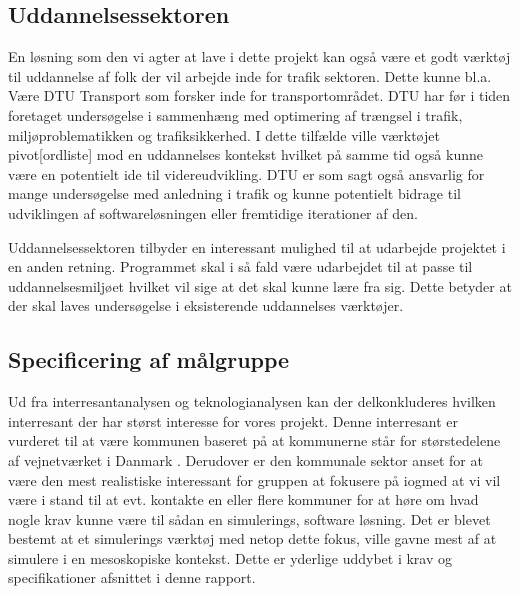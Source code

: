 \subsection{Uddannelsessektoren}
En løsning som den vi agter at lave i dette projekt kan også være et godt værktøj til uddannelse af folk der vil arbejde inde for trafik sektoren. Dette kunne bl.a. Være DTU Transport som forsker inde for transportområdet. DTU har før i tiden foretaget undersøgelse i sammenhæng med optimering af trængsel i trafik, miljøproblematikken og trafiksikkerhed\cite{DtuForskning}. I dette tilfælde ville værktøjet pivot[ordliste] mod en uddannelses kontekst hvilket på samme tid også kunne være en potentielt ide til videreudvikling. DTU er som sagt også ansvarlig for mange undersøgelse med anledning i trafik og kunne potentielt bidrage til udviklingen af softwareløsningen eller fremtidige iterationer af den.

\vspace{5mm}

Uddannelsessektoren tilbyder en interessant mulighed til at udarbejde projektet i en anden retning. Programmet skal i så fald være udarbejdet til at passe til uddannelsesmiljøet hvilket vil sige at det skal kunne lære fra sig. Dette betyder at der skal laves undersøgelse i eksisterende uddannelses værktøjer.

\subsection{Specificering af målgruppe}

Ud fra interresantanalysen og teknologianalysen kan der delkonkluderes hvilken interresant der har størst interesse for vores projekt. Denne interresant er vurderet til at være kommunen baseret på at kommunerne står for størstedelene af vejnetværket i Danmark \cite{benjasfar}. Derudover er den kommunale sektor anset for at være den mest realistiske interessant for gruppen at fokusere på iogmed at vi vil være i stand til at evt. kontakte en eller flere kommuner for at høre om hvad nogle krav kunne være til sådan en simulerings, software løsning. Det er blevet bestemt at et simulerings værktøj med netop dette fokus, ville gavne mest af at simulere i en mesoskopiske kontekst. Dette er yderlige uddybet i krav og specifikationer afsnittet i denne rapport.
